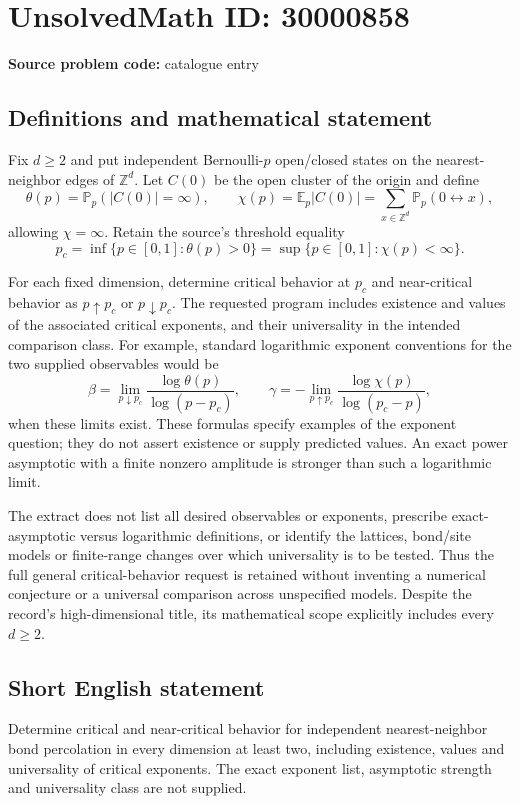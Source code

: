 \documentclass[11pt]{article}
\newcommand{\Z}{\mathbb{Z}}
\begin{document}
\section*{UnsolvedMath ID: 30000858}
\textbf{Source problem code:} catalogue entry
\subsection{Definitions and mathematical statement}
Fix $d\geq2$ and put independent Bernoulli-$p$ open/closed states on the nearest-neighbor edges of $\Z^d$. Let $C(0)$ be the open cluster of the origin and define
\[
\theta(p)=\mathbb P_p(|C(0)|=\infty),\qquad
\chi(p)=\mathbb E_p|C(0)|=\sum_{x\in\Z^d}\mathbb P_p(0\leftrightarrow x),
\]
allowing $\chi=\infty$. Retain the source's threshold equality
\[
p_c=\inf\{p\in[0,1]:\theta(p)>0\}
=\sup\{p\in[0,1]:\chi(p)<\infty\}.
\]

For each fixed dimension, determine critical behavior at $p_c$ and near-critical behavior as $p\uparrow p_c$ or $p\downarrow p_c$. The requested program includes existence and values of the associated critical exponents, and their universality in the intended comparison class. For example, standard logarithmic exponent conventions for the two supplied observables would be
\[
\beta=\lim_{p\downarrow p_c}\frac{\log\theta(p)}{\log(p-p_c)},
\qquad
\gamma=-\lim_{p\uparrow p_c}\frac{\log\chi(p)}{\log(p_c-p)},
\]
when these limits exist. These formulas specify examples of the exponent question; they do not assert existence or supply predicted values. An exact power asymptotic with a finite nonzero amplitude is stronger than such a logarithmic limit.

The extract does not list all desired observables or exponents, prescribe exact-asymptotic versus logarithmic definitions, or identify the lattices, bond/site models or finite-range changes over which universality is to be tested. Thus the full general critical-behavior request is retained without inventing a numerical conjecture or a universal comparison across unspecified models. Despite the record's high-dimensional title, its mathematical scope explicitly includes every $d\geq2$.
\subsection{Short English statement}
Determine critical and near-critical behavior for independent nearest-neighbor bond percolation in every dimension at least two, including existence, values and universality of critical exponents. The exact exponent list, asymptotic strength and universality class are not supplied.
\end{document}
